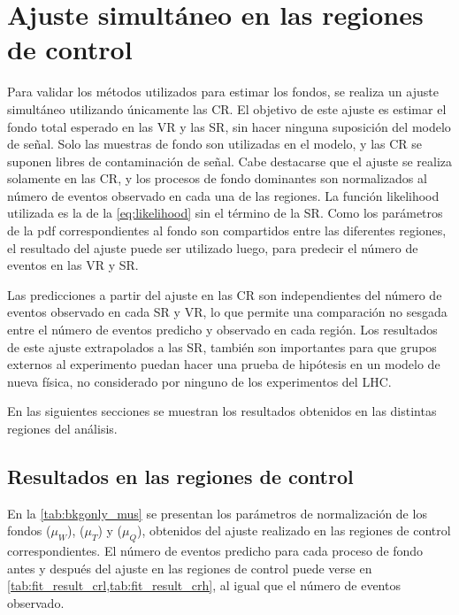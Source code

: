 


\section{Ajuste simultáneo en las regiones de control}
\label{sec:bkgonlyfit}

Para validar  los métodos utilizados para estimar los
fondos, se realiza un ajuste simultáneo utilizando únicamente las CR.
El objetivo de este ajuste es estimar el fondo total esperado en las VR y las
SR, sin hacer ninguna suposición del modelo de señal. Solo las muestras de fondo
son utilizadas en el modelo, y las CR se suponen libres de contaminación de
señal. Cabe destacarse que el ajuste se realiza solamente en las CR, y los procesos de fondo dominantes
son normalizados al número de eventos observado en cada una de las regiones. La
función likelihood utilizada es la de la \cref{eq:likelihood} sin el término de la
SR. Como los parámetros de la pdf correspondientes al fondo son compartidos
entre las diferentes regiones, el resultado del ajuste puede ser utilizado luego, para
predecir el número de eventos en las VR y SR.

Las predicciones a partir del ajuste en las CR son independientes del número de
eventos observado en cada SR y VR, lo que permite una comparación no sesgada
entre el número de eventos predicho y observado en cada región. Los resultados
de este ajuste extrapolados a las SR, también son importantes para que grupos
externos al experimento puedan hacer una prueba de hipótesis en un modelo de
nueva física, no considerado por ninguno de los experimentos del LHC.

En las siguientes secciones se muestran los resultados obtenidos
en las distintas regiones del análisis.



\subsection{Resultados en las regiones de control}

En la \cref{tab:bkgonly_mus} se presentan los parámetros de normalización de
los fondos {\wgam} ($\mu_W$), {\ttgam} ($\mu_T$) y {\gjet}
($\mu_Q$), obtenidos del ajuste realizado en las regiones de control correspondientes.
El número de eventos predicho para cada proceso de fondo antes y después del ajuste en
las regiones de control puede verse en \cref{tab:fit_result_crl,tab:fit_result_crh}, al
igual que el número de eventos observado.


